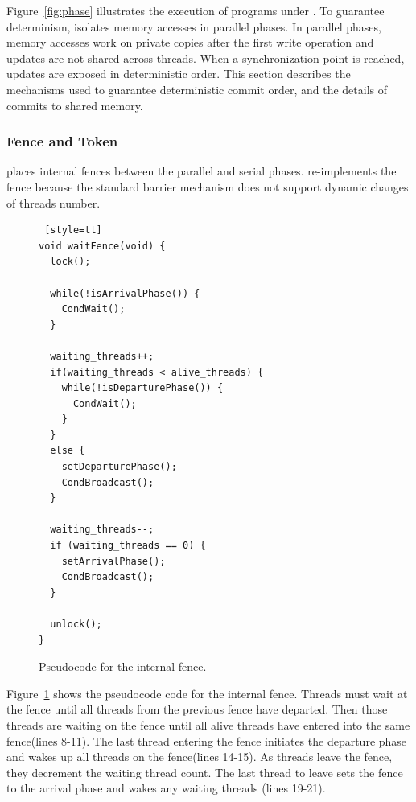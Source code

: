 Figure~\ref{fig:phase} illustrates the execution of programs under \dthreads{}.  To guarantee determinism, \dthreads{} isolates memory accesses in parallel phases. In parallel phases, memory accesses work on private copies after the first write operation and updates are not shared across threads.  When a synchronization point is reached, updates are exposed in deterministic order.  This section describes the mechanisms used to guarantee deterministic commit order, and the details of commits to shared memory.

\subsubsection{Fence and Token}
\label{sec:schedule}

\dthreads{} places internal fences between the parallel and serial phases. \dthreads{} re-implements the fence because the standard \pthreads{} barrier mechanism does not support dynamic changes of threads number. 

\begin{figure}
\begin{lstlisting} [style=tt]
void waitFence(void) {
  lock();
	
  while(!isArrivalPhase()) { 
    CondWait();
  }

  waiting_threads++;
  if(waiting_threads < alive_threads) {
    while(!isDeparturePhase()) {
      CondWait();
    }
  } 
  else {
    setDeparturePhase();
    CondBroadcast();
  }

  waiting_threads--;
  if (waiting_threads == 0) {
    setArrivalPhase();
    CondBroadcast();
  }

  unlock();
}

\end{lstlisting}
\caption{Pseudocode for the internal fence.\label{fig:internalFence}}
\end{figure}

Figure~\ref{fig:internalFence} shows the pseudocode code for the internal fence. Threads must wait at the fence until all threads from the previous fence have departed. Then those threads are waiting on the fence until all alive threads  have entered into the same fence(lines 8-11). 
The last thread entering the fence initiates the departure phase and wakes up all threads on the fence(lines 14-15). As threads leave the fence, they decrement the waiting thread count.  The last thread to leave sets the fence to the arrival phase and wakes any waiting threads (lines 19-21).

